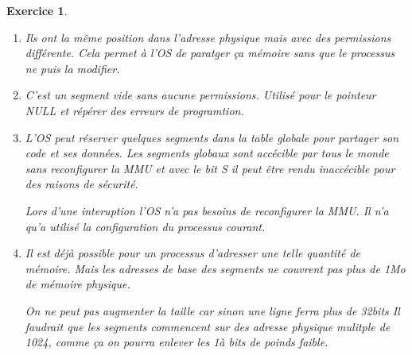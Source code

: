 \documentclass{article}
\theoremstyle{plain}
\newtheorem{exo}{Exercice}%
\begin{document}
\begin{exo}
\begin{enumerate}
    \item Ils ont la même position dans l'adresse physique mais avec des permissions différente.
        Cela permet à l'OS de paratger ça mémoire sans que le processus ne puis la modifier.

    \item C'est un segment vide sans aucune permissions. Utilisé pour le pointeur NULL et répérer 
        des erreurs de programtion.

    \item L'OS peut réserver quelques segments dans la table globale pour partager 
        son code et ses données. Les segments globaux sont accécible par tous le monde
        sans reconfigurer la MMU et avec le bit S il peut être rendu inaccécible pour 
        des raisons de sécurité.

        Lors d'une interuption l'OS n'a pas besoins de reconfigurer la MMU. Il n'a qu'a utilisé
        la configuration du processus courant.

    \item  Il est déjà possible pour un processus d'adresser une telle quantité de mémoire.
        Mais les adresses de base des segments ne couvrent pas plus de 1Mo de mémoire physique.

        On ne peut pas augmenter la taille car sinon une ligne ferra plus de 32bits
        Il faudrait que les segments commencent sur des adresse physique mulitple de 1024, 
        comme ça on pourra enlever les 1à bits de poinds faible.
\end{enumerate}
\end{exo}
\end{document}
